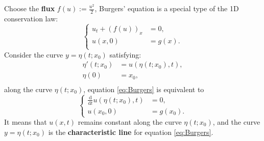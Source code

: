 \documentclass[a4paper]{article}
\newcommand{\dif}{\mathrm{d}}
\begin{document}
Choose the \textbf{flux} $f(u):=\frac{u^2}{2}$, Burgers' equation is a special type of the 
1D conservation law:
\begin{equation}
    \label{eq:conservationlaw}
    \left\{
    \begin{aligned}
        u_{t}+(f(u))_{x}&=0,\\
        u(x,0)&=g(x).\\
    \end{aligned}
    \right.
\end{equation}
Consider the curve $y=\eta(t;x_{0})$ satisfying:
\begin{equation}
    \label{eq:Char_line}
    \begin{aligned}
        \eta'(t;x_{0})&=u(\eta(t;x_{0}),t),\\
        \eta(0)&=x_{0},\\
    \end{aligned}
\end{equation}
along the curve $\eta(t;x_0)$, equation \eqref{eq:Burgers} 
is equivalent to 
\begin{equation}
    \label{eq:Characteristic_cons_law}
    \left\{
    \begin{aligned}
        \frac{\dif}{\dif t}u(\eta(t;x_{0}),t)&=0,\\
        u(x_{0},0)&=g(x_{0}).
    \end{aligned}
    \right.
\end{equation}
It means that $u(x,t)$ remains constant along the curve 
$\eta(t;x_{0})$, and the curve $y=\eta(t;x_{0})$ is the \textbf{characteristic line} 
for equation \eqref{eq:Burgers}.
\end{document}
